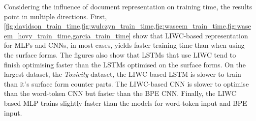 Considering the influence of document representation on training time, the results point in multiple directions.
First, \cref{fig:davidson_train_time,fig:wulczyn_train_time,fig:waseem_train_time,fig:waseem_hovy_train_time,garcia_train_time} show that LIWC-based representation for MLPs and CNNs, in most cases, yields faster training time than when using the surface forms.
The figures also show that LSTMs that use LIWC tend to finish optimising faster than the LSTMs optimised on the surface forms.
On the largest dataset, the \textit{Toxicity} dataset, the LIWC-based LSTM is slower to train than it's surface form counter parts.
The LIWC-based CNN is slower to optimise than the word-token CNN but faster than the BPE CNN.
Finally, the LIWC based MLP trains slightly faster than the models for word-token input and BPE input.

